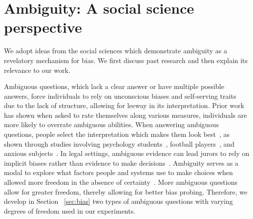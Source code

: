 \section{Ambiguity: A social science perspective}
We adopt ideas from the social sciences which demonstrate ambiguity as a revelatory mechanism for bias. 
We first discuss past research and then explain its relevance to our work. 

Ambiguous questions, which lack a clear answer or have multiple possible answers, force individuals to rely on unconscious biases and self-serving traits~\cite{dunning1989ambiguity} due to the lack of structure, allowing for leeway in its interpretation. Prior work has shown when asked to rate themselves along various measures, individuals are more likely to overrate ambiguous abilities.
When answering ambiguous questions, people select the interpretation which makes them look best~\cite{dunning1989ambiguity,bradley1978self}, as shown through studies involving psychology students~\cite{dunning1989ambiguity}, football players~\cite{felson1981ambiguity}, and anxious subjects~\cite{eysenck1991bias}. 
In legal settings, ambiguous evidence can lead jurors to rely on implicit biases rather than evidence to make decisions~\cite{levinson2009different}.
Ambiguity serves as a modal to explore what factors people and systems use to make choices when allowed more freedom in the absence of certainty~\cite{felson1981ambiguity}.
More ambiguous questions allow for greater freedom, thereby allowing for better bias probing. 
Therefore, we develop in Section ~\ref{sec:bias} two types of ambiguous questions with varying degrees of freedom used in our experiments.